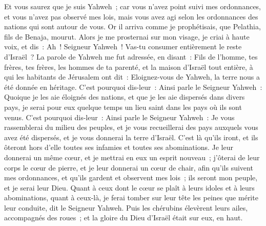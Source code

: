 \begin{multicols}{2}
Et vous saurez que je suis Yahweh~; car vous n'avez point suivi mes ordonnances, et vous n'avez pas observé mes lois, mais vous avez agi selon les ordonnances des nations qui sont autour de vous.
Or il arriva comme je prophétisais, que Pelathia, fils de Benaja, mourut. Alors je me prosternai sur mon visage, je criai à haute voix, et dis~: Ah~! Seigneur Yahweh~! Vas-tu consumer entièrement le reste d'Israël~?
La parole de Yahweh me fut adressée, en disant~:
Fils de l'homme, tes frères, tes frères, les hommes de ta parenté, et la maison d'Israël tout entière, à qui les habitants de Jérusalem ont dit~: Eloignez-vous de Yahweh, la terre nous a été donnée en héritage.
C'est pourquoi dis-leur~: Ainsi parle le Seigneur Yahweh~: Quoique je les aie éloignés des nations, et que je les aie dispersés dans divers pays, je serai pour eux quelque temps un lieu saint dans les pays où ils sont venus.
C'est pourquoi dis-leur~: Ainsi parle le Seigneur Yahweh~: Je vous rassemblerai du milieu des peuples, et je vous recueillerai des pays auxquels vous avez été dispersés, et je vous donnerai la terre d'Israël.
C'est là qu'ils iront, et ils ôteront hors d'elle toutes ses infamies et toutes ses abominations.
Je leur donnerai un même cœur, et je mettrai en eux un esprit nouveau~; j'ôterai de leur corps le cœur de pierre, et je leur donnerai un cœur de chair,
afin qu'ils suivent mes ordonnances, et qu'ils gardent et observent mes lois~; ils seront mon peuple, et je serai leur Dieu.
Quant à ceux dont le cœur se plaît à leurs idoles et à leurs abominations, quant à ceux-là, je ferai tomber sur leur tête les peines que mérite leur conduite, dit le Seigneur Yahweh.
Puis les chérubins élevèrent leurs ailes, accompagnés des roues~; et la gloire du Dieu d'Israël était sur eux, en haut.

\end{multicols}
